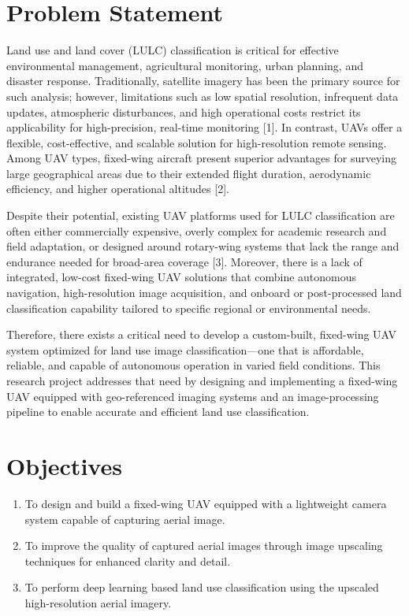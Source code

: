 \section{Problem Statement}
Land use and land cover (LULC) classification is critical for effective environmental management, agricultural monitoring, urban planning, and disaster response. Traditionally, satellite imagery has been the primary source for such analysis; however, limitations such as low spatial resolution, infrequent data updates, atmospheric disturbances, and high operational costs restrict its applicability for high-precision, real-time monitoring [1]. In contrast, UAVs offer a flexible, cost-effective, and scalable solution for high-resolution remote sensing. Among UAV types, fixed-wing aircraft present superior advantages for surveying large geographical areas due to their extended flight duration, aerodynamic efficiency, and higher operational altitudes [2].

Despite their potential, existing UAV platforms used for LULC classification are often either commercially expensive, overly complex for academic research and field adaptation, or designed around rotary-wing systems that lack the range and endurance needed for broad-area coverage [3]. Moreover, there is a lack of integrated, low-cost fixed-wing UAV solutions that combine autonomous navigation, high-resolution image acquisition, and onboard or post-processed land classification capability tailored to specific regional or environmental needs.

Therefore, there exists a critical need to develop a custom-built, fixed-wing UAV system optimized for land use image classification—one that is affordable, reliable, and capable of autonomous operation in varied field conditions. This research project addresses that need by designing and implementing a fixed-wing UAV equipped with geo-referenced imaging systems and an image-processing pipeline to enable accurate and efficient land use classification.


\section{Objectives}

\begin{enumerate}
    \item To design and build a fixed-wing UAV equipped with a lightweight camera system capable of capturing aerial image.
    \item To improve the quality of captured aerial images through image upscaling techniques for enhanced clarity and detail.
    \item To perform deep learning based land use classification using the upscaled high-resolution aerial imagery.
\end{enumerate}

